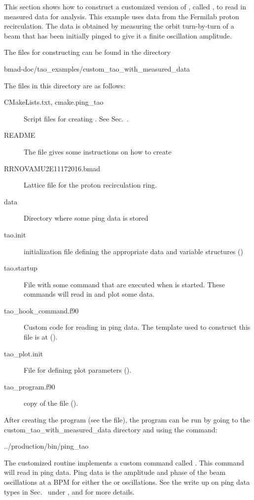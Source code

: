 {{{{This section shows how to construct a customized version of \tao, called , to read in
measured data for analysis. This example uses data from the Fermilab proton recirculation. The data
is obtained by measuring the orbit turn-by-turn of a beam that has been initially pinged to give it
a finite oscillation amplitude.

The files for constructing  can be found
in the directory
\begin{example}
  bmad-doc/tao_examples/custom_tao_with_measured_data
\end{example}
The files in this directory are as follows:
\begin{description}
  \item[CMakeLists.txt, cmake.ping_tao] \Newline
Script files for creating . See Sec.~.
  \item[README] \Newline
The  file gives some instructions on how to create 
  \item[RRNOVAMU2E11172016.bmad] \Newline
Lattice file for the proton recirculation ring.
  \item[data] \Newline
Directory where some ping data is stored
  \item[tao.init] \Newline
\tao initialization file defining the appropriate data and variable structures ()
  \item[tao.startup] \Newline
File with some command that are executed when \tao is started. These commands will read in
and plot some data.
  \item[tao_hook_command.f90] \Newline
Custom code for reading in ping data. The template used to construct this file is at
 ().
  \item[tao_plot.init] \Newline
File for defining plot parameters ().
  \item[tao_program.f90] \Newline
copy of the  file ().
\end{description}

After creating the  program (see the  file), the program can be run by going
to the custom_tao_with_measured_data directory and using the command:
\begin{example}
	../production/bin/ping_tao
\end{example}

The customized  routine implements a custom command called
.  This command will read in ping data. Ping data is the amplitude and phase
of the beam oscillations at a BPM for either the  or  oscillations.
See the write up on ping data types in Sec.~ under ,
and  for more details.

}}}}
